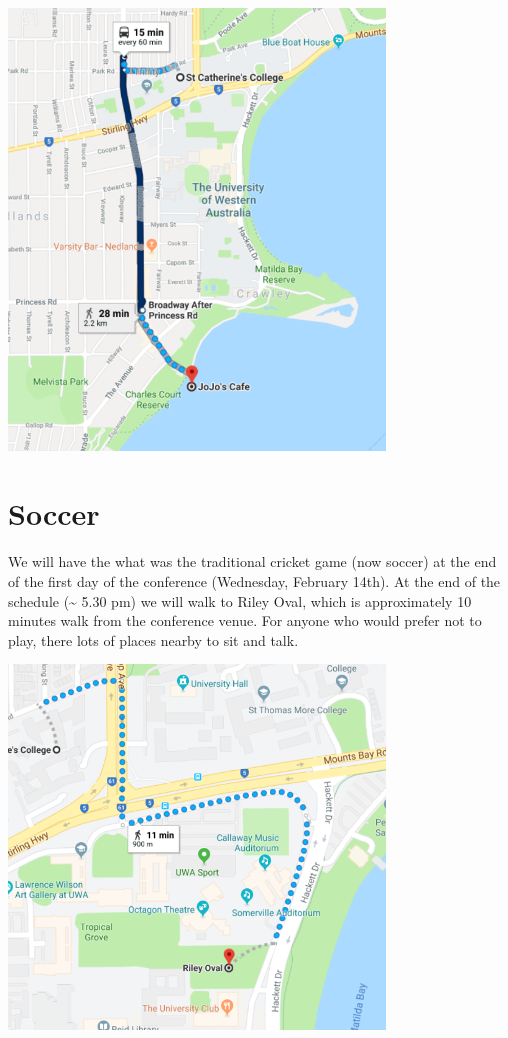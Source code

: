 \documentclass[]{article}
\begin{document}
\begin{center}
\vspace{1 cm}
\includegraphics[width=10cm]{images/Dinner}
\vspace{2 cm}
\end{center}\newpage

\section{Soccer}\label{soccer}

We will have the what was the traditional cricket game (now soccer) at
the end of the first day of the conference (Wednesday, February 14th).
At the end of the schedule (\textasciitilde{} 5.30 pm) we will walk to
Riley Oval, which is approximately 10 minutes walk from the conference
venue. For anyone who would prefer not to play, there lots of places
nearby to sit and talk.

\begin{center}
\vspace{2 cm}
\includegraphics[width=10cm]{images/Soccer}
\vspace{2 cm}
\end{center}\newpage
\end{document}
